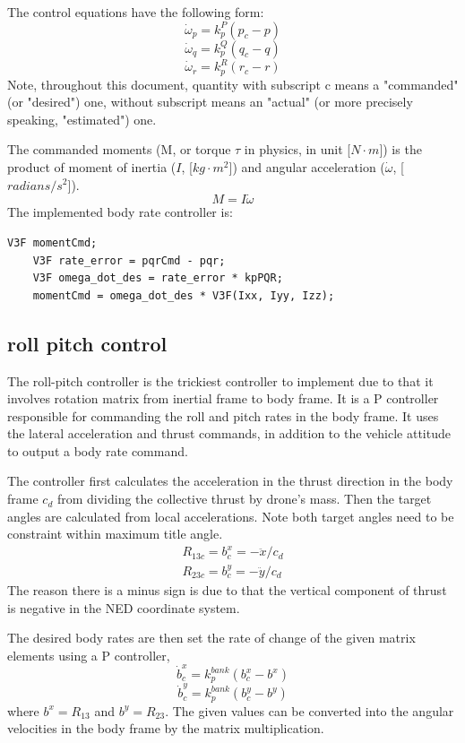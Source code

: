 \documentclass[letterpaper]{article}
\begin{document}
The control equations have the following form:
$$ \dot{\omega}_{p} = k_{p}^{P} (p_c - p) $$
$$ \dot{\omega}_{q} = k_{p}^{Q} (q_c - q) $$
$$ \dot{\omega}_{r} = k_{p}^{R} (r_c - r) $$
Note, throughout this document, quantity with subscript c means a "commanded" (or "desired") one, without subscript means an "actual" (or more precisely speaking, "estimated") one.

The commanded moments (M, or torque $\tau$ in physics, in unit [$N \cdot m$]) is the product of moment of inertia ($I$, [$kg \cdot m^2$]) and angular acceleration ($\dot{\omega}$, [$radians/s^2$]).
$$ M = I \dot{\omega} $$
The implemented body rate controller is:

\begin{lstlisting}[frame=single]
    V3F momentCmd;
    V3F rate_error = pqrCmd - pqr;
    V3F omega_dot_des = rate_error * kpPQR;
    momentCmd = omega_dot_des * V3F(Ixx, Iyy, Izz);
\end{lstlisting}

\subsection{roll pitch control} \label{control:rollpitch}
The roll-pitch controller is the trickiest controller to implement due to that it involves rotation matrix from inertial frame to body frame. It is a P controller responsible for commanding the roll and pitch rates in the body frame. It uses the lateral acceleration and thrust commands, in addition to the vehicle attitude to output a body rate command. 

The controller first calculates the acceleration in the thrust direction in the body frame $c_d$ from dividing the collective thrust by drone's mass. Then the target angles are calculated from local accelerations. Note both target angles need to be constraint within maximum title angle.
\begin{gather*}
R_{13c} = b^x_c = - \ddot{x} / c_d \\
R_{23c} = b^y_c = - \ddot{y} / c_d
\end{gather*}
The reason there is a minus sign is due to that the vertical component of thrust is negative in the NED coordinate system.

The desired body rates are then set the rate of change of the given matrix elements using a P controller,
$$\dot{b}^x_c  = k_p^{bank}(b^x_c - b^x)$$
$$\dot{b}^y_c  = k_p^{bank}(b^y_c - b^y)$$
where $b^x = R_{13}$ and $b^y = R_{23}$. The given values can be converted into the angular velocities in the body frame by the matrix multiplication. 
\end{document}
